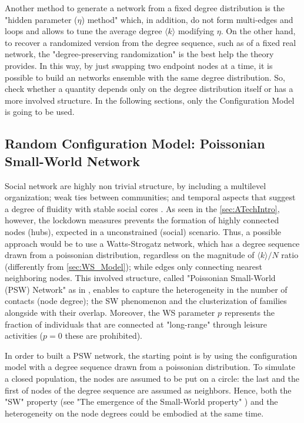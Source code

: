 \documentclass[a4paper,12pt,twoside]{book} %
\theoremstyle{definition}
\begin{document}
Another method to generate a network from a fixed degree distribution is the "hidden parameter ($\eta$) method" which, in addition, do not form multi-edges and loops \cite{barabasi::2016networkbook} and allows to tune the average degree $\langle k \rangle$ modifying $\eta$.
On the other hand, to recover a randomized version from the degree sequence, such as of a fixed real network, the "degree-preserving randomization" is the best help the theory provides. In this way, by just swapping two endpoint nodes at a time, it is possible to build an networks ensemble with the same degree distribution. So, check whether a quantity depends only on the degree distribution itself or has a more involved structure.
In the following sections, only the Configuration Model is going to be used.

\clearpage
\subsection{Random Configuration Model: Poissonian Small-World Network}
Social network are highly non trivial structure, by including a multilevel organization; weak ties between communities; and temporal aspects that suggest a degree of fluidity with stable social cores \cite{Thurner::NetBasedExpl}.
As seen in the \autoref{sec:ATechIntro}, however, the lockdown measures prevents the formation of highly connected nodes (hubs), expected in a unconstrained (social) scenario. Thus, a possible approach would be to use a Watts-Strogatz network, which has a degree sequence drawn from a poissonian distribution, regardless on the magnitude of $\langle k \rangle / N$ ratio (differently from \autoref{sec:WS_Model}); while edges only connecting nearest neighboring nodes.
This involved structure, called "Poissonian Small-World (PSW) Network" as in \cite{Thurner::NetBasedExpl}, enables to capture the heterogeneity in the number of contacts (node degree); the SW phenomenon and the clusterization of families alongside with their overlap. Moreover, the WS parameter $p$ represents the fraction of individuals that are connected at "long-range" through leisure activities ($p = 0$ these are prohibited).

In order to built a PSW network, the starting point is by using the configuration model with a degree sequence drawn from a poissonian distribution. To simulate a closed population, the nodes are assumed to be put on a circle: the last and the first of nodes of the degree sequence are assumed as neighbors. Hence, both the "SW" property (see "The emergence of the Small-World property" ) and the heterogeneity on the node degrees could be embodied at the same time. 
\end{document}

